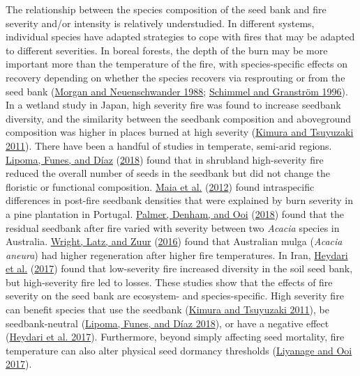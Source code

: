 \documentclass[
  12pt,
]{article}
\begin{document}
The relationship between the species composition of the seed bank and
fire severity and/or intensity is relatively understudied. In different
systems, individual species have adapted strategies to cope with fires
that may be adapted to different severities. In boreal forests, the
depth of the burn may be more important more than the temperature of the
fire, with species-specific effects on recovery depending on whether the
species recovers via resprouting or from the seed bank
(\protect\hyperlink{ref-Morgan1988}{Morgan and Neuenschwander 1988};
\protect\hyperlink{ref-Schimmel1996}{Schimmel and Granström 1996}). In a
wetland study in Japan, high severity fire was found to increase
seedbank diversity, and the similarity between the seedbank composition
and aboveground composition was higher in places burned at high severity
(\protect\hyperlink{ref-Kimura2011}{Kimura and Tsuyuzaki 2011}). There
have been a handful of studies in temperate, semi-arid regions.
\protect\hyperlink{ref-Lipoma2018}{Lipoma, Funes, and Díaz}
(\protect\hyperlink{ref-Lipoma2018}{2018}) found that in shrubland
high-severity fire reduced the overall number of seeds in the seedbank
but did not change the floristic or functional composition.
\protect\hyperlink{ref-Maia2012}{Maia et al.}
(\protect\hyperlink{ref-Maia2012}{2012}) found intraspecific differences
in post-fire seedbank densities that were explained by burn severity in
a pine plantation in Portugal.
\protect\hyperlink{ref-Palmer2018}{Palmer, Denham, and Ooi}
(\protect\hyperlink{ref-Palmer2018}{2018}) found that the residual
seedbank after fire varied with severity between two \emph{Acacia}
species in Australia. \protect\hyperlink{ref-Wright2016}{Wright, Latz,
and Zuur} (\protect\hyperlink{ref-Wright2016}{2016}) found that
Australian mulga (\emph{Acacia aneura}) had higher regeneration after
higher fire temperatures. In Iran,
\protect\hyperlink{ref-Heydari2017}{Heydari et al.}
(\protect\hyperlink{ref-Heydari2017}{2017}) found that low-severity fire
increased diversity in the soil seed bank, but high-severity fire led to
losses. These studies show that the effects of fire severity on the seed
bank are ecosystem- and species-specific. High severity fire can benefit
species that use the seedbank (\protect\hyperlink{ref-Kimura2011}{Kimura
and Tsuyuzaki 2011}), be seedbank-neutral
(\protect\hyperlink{ref-Lipoma2018}{Lipoma, Funes, and Díaz 2018}), or
have a negative effect (\protect\hyperlink{ref-Heydari2017}{Heydari et
al. 2017}). Furthermore, beyond simply affecting seed mortality, fire
temperature can also alter physical seed dormancy thresholds
(\protect\hyperlink{ref-Liyanage2017}{Liyanage and Ooi 2017}).
\end{document}
